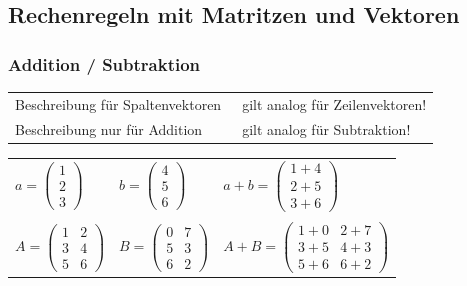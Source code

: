\subsection{Rechenregeln mit Matritzen und Vektoren}

\subsubsection{Addition / Subtraktion}

\begin{tabular}{ll}
	Beschreibung für Spaltenvektoren 	& \textrightarrow\ gilt analog für Zeilenvektoren!	\\
	Beschreibung nur für Addition 		& \textrightarrow\ gilt analog für Subtraktion!
\end{tabular}

\vspace{0.2cm}

\begin{tabular}{lll}
	$a = 
	\begin{pmatrix} 
		1\\2\\3 
	\end{pmatrix}$ & 
	$b = 
	\begin{pmatrix} 
		4\\5\\6
	\end{pmatrix}$ &
	$a+b = 
	\begin{pmatrix} 
		1+4\\2+5\\3+6 
	\end{pmatrix}$ 
	\\
	\\
	$A=
	\begin{pmatrix}
		1&2\\
		3&4\\
		5&6
	\end{pmatrix}$ &
	$ B=
	\begin{pmatrix}
		0&7\\
		5&3\\
		6&2
	\end{pmatrix}$ &
	$A+B=
	\begin{pmatrix}
		1+0&2+7\\
		3+5&4+3\\
		5+6&6+2
	\end{pmatrix}$
\end{tabular}


